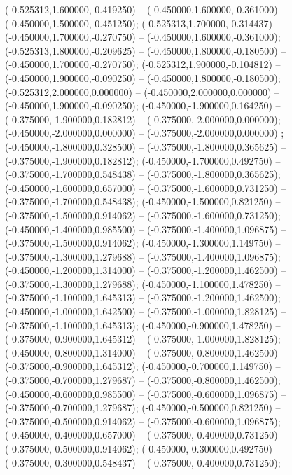  (-0.525312,1.600000,-0.419250) -- (-0.450000,1.600000,-0.361000) -- (-0.450000,1.500000,-0.451250);
 (-0.525313,1.700000,-0.314437) -- (-0.450000,1.700000,-0.270750) -- (-0.450000,1.600000,-0.361000);
 (-0.525313,1.800000,-0.209625) -- (-0.450000,1.800000,-0.180500) -- (-0.450000,1.700000,-0.270750);
 (-0.525312,1.900000,-0.104812) -- (-0.450000,1.900000,-0.090250) -- (-0.450000,1.800000,-0.180500);
 (-0.525312,2.000000,0.000000) -- (-0.450000,2.000000,0.000000) -- (-0.450000,1.900000,-0.090250);
 (-0.450000,-1.900000,0.164250) -- (-0.375000,-1.900000,0.182812) -- (-0.375000,-2.000000,0.000000);
 (-0.450000,-2.000000,0.000000) -- (-0.375000,-2.000000,0.000000) ;
 (-0.450000,-1.800000,0.328500) -- (-0.375000,-1.800000,0.365625) -- (-0.375000,-1.900000,0.182812);
 (-0.450000,-1.700000,0.492750) -- (-0.375000,-1.700000,0.548438) -- (-0.375000,-1.800000,0.365625);
 (-0.450000,-1.600000,0.657000) -- (-0.375000,-1.600000,0.731250) -- (-0.375000,-1.700000,0.548438);
 (-0.450000,-1.500000,0.821250) -- (-0.375000,-1.500000,0.914062) -- (-0.375000,-1.600000,0.731250);
 (-0.450000,-1.400000,0.985500) -- (-0.375000,-1.400000,1.096875) -- (-0.375000,-1.500000,0.914062);
 (-0.450000,-1.300000,1.149750) -- (-0.375000,-1.300000,1.279688) -- (-0.375000,-1.400000,1.096875);
 (-0.450000,-1.200000,1.314000) -- (-0.375000,-1.200000,1.462500) -- (-0.375000,-1.300000,1.279688);
 (-0.450000,-1.100000,1.478250) -- (-0.375000,-1.100000,1.645313) -- (-0.375000,-1.200000,1.462500);
 (-0.450000,-1.000000,1.642500) -- (-0.375000,-1.000000,1.828125) -- (-0.375000,-1.100000,1.645313);
 (-0.450000,-0.900000,1.478250) -- (-0.375000,-0.900000,1.645312) -- (-0.375000,-1.000000,1.828125);
 (-0.450000,-0.800000,1.314000) -- (-0.375000,-0.800000,1.462500) -- (-0.375000,-0.900000,1.645312);
 (-0.450000,-0.700000,1.149750) -- (-0.375000,-0.700000,1.279687) -- (-0.375000,-0.800000,1.462500);
 (-0.450000,-0.600000,0.985500) -- (-0.375000,-0.600000,1.096875) -- (-0.375000,-0.700000,1.279687);
 (-0.450000,-0.500000,0.821250) -- (-0.375000,-0.500000,0.914062) -- (-0.375000,-0.600000,1.096875);
 (-0.450000,-0.400000,0.657000) -- (-0.375000,-0.400000,0.731250) -- (-0.375000,-0.500000,0.914062);
 (-0.450000,-0.300000,0.492750) -- (-0.375000,-0.300000,0.548437) -- (-0.375000,-0.400000,0.731250);
